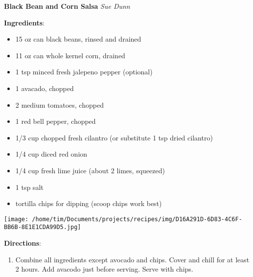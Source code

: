 \documentclass[11pt, twoside, openany]{book}
\begin{document}
\noindent\begin{minipage}[t]{\linewidth}%
{\Large\textbf{Black Bean and Corn Salsa}} \label{black-bean-and-corn-salsa}\hfill\textit{Sue Dunn}\\
\noindent\begin{minipage}[t]{0.78\linewidth}%
\textbf{Ingredients}:\vspace{-3mm}
\begin{multicols}{2}
\begin{itemize}\setlength\itemsep{-1mm}
\item 15 oz can black beans, rinsed and drained
\item 11 oz can whole kernel corn, drained
\item 1 tsp minced fresh jalepeno pepper (optional)
\item 1 avacado, chopped
\item 2 medium tomatoes, chopped
\item 1 red bell pepper, chopped
\item 1/3 cup chopped fresh cilantro (or substitute 1 tsp dried cilantro)
\item 1/4 cup diced red onion
\item 1/4 cup fresh lime juice (about 2 limes, squeezed)
\item 1 tsp salt
\item tortilla chips for dipping (scoop chips work best)
\end{itemize}
\end{multicols}
\end{minipage}
\noindent\begin{minipage}[t]{0.18\linewidth}
\centering \strut\vspace*{-\baselineskip}\newline
\texttt{[image: /home/tim/Documents/projects/recipes/img/D16A291D-6D83-4C6F-BB6B-8E1E1CDA99D5.jpg]}\\
\end{minipage}\vspace{3mm}
\textbf{Directions}:
\vspace{-3mm}\begin{enumerate}\setlength\itemsep{-1mm}
\item Combine all ingredients except avocado and chips. Cover and chill for at least 2 hours. Add avacodo just before serving. Serve with chips.
\end{enumerate}
\end{minipage}\vspace{8mm}
\end{document}
